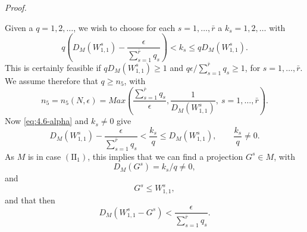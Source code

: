 \documentclass[b5paper,twoside]{article}
\theoremstyle{mvnplain}
\renewenvironment{proof}[1][Proof]{%
  \par\addvspace{0.35\baselineskip}%
  \noindent\textit{#1.}\ \normalfont\ignorespaces
}{%
  \par\addvspace{0.35\baselineskip}%
}
\newcommand{\M}{\mathbf M}
\newcommand{\N}{\mathbf N}
\def\M{M}%
\def\N{N}%
\def\operatorname#1{#1}%
\begin{document}
\begin{proof}
Given a \(q=1,2,\ldots\), we wish to choose for each
\(s=1,\ldots,\bar r\) a \(k_s=1,2,\ldots\) with
\begin{equation}\tag{4.6.\(\alpha\)}\label{eq:4.6-alpha}
 q\left(D_{\M}(W^s_{1,1})-\frac{\epsilon}{\sum_{s=1}^{\bar r}q_s}\right)
 <k_s\leq qD_{\M}(W^s_{1,1}).
\end{equation}
This is certainly feasible if \(qD_{\M}(W^s_{1,1})\geq1\) and
\(q\epsilon/\sum_{s=1}^{\bar r}q_s\geq1\), for
\(s=1,\ldots,\bar r\). We assume therefore that \(q\geq n_5\), with
\begin{equation}\tag{4.6.\(\beta\)}\label{eq:4.6-beta}
 n_5=n_5(\N,\epsilon)=
 \operatorname{Max}\left(\frac{\sum_{s=1}^{\bar r}q_s}{\epsilon},
 \frac{1}{D_{\M}(W^s_{1,1})},\ s=1,\ldots,\bar r\right).
\end{equation}
Now \eqref{eq:4.6-alpha} and \(k_s\ne0\) give
\[
 D_{\M}(W^s_{1,1})-\frac{\epsilon}{\sum_{s=1}^{\bar r}q_s}
 <\frac{k_s}{q}\leq D_{\M}(W^s_{1,1}),\qquad \frac{k_s}{q}\ne0.
\]
As \(\M\) is in case \((\mathrm{II}_1)\), this implies that we can find a
projection \(G^s\in\M\), with
\begin{equation}\tag{4.6.\(\gamma\)}\label{eq:4.6-gamma}
 D_{\M}(G^s)=k_s/q\ne0,
\end{equation}
and
\begin{equation}\tag{4.6.\(\delta\)}\label{eq:4.6-delta}
 G^s\leq W^s_{1,1},
\end{equation}
and that then
\begin{equation}\tag{4.6.\(\epsilon\)}\label{eq:4.6-epsilon}
 D_{\M}(W^s_{1,1}-G^s)<\frac{\epsilon}{\sum_{s=1}^{\bar r}q_s}.
\end{equation}


\end{proof}
\end{document}
